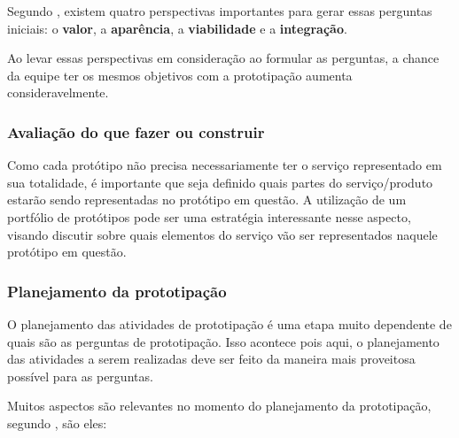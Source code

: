 Segundo \cite{Stickdorn2019}, existem quatro perspectivas importantes para gerar essas perguntas iniciais: o \textbf{valor}, a \textbf{aparência}, a \textbf{viabilidade} e a \textbf{integração}. 

Ao levar essas perspectivas em consideração ao formular as perguntas, a chance da equipe ter os mesmos objetivos com a prototipação aumenta consideravelmente.

\subsubsection{Avaliação do que fazer ou construir}

Como cada protótipo não precisa necessariamente ter o serviço representado em sua totalidade, é importante que seja definido quais partes do serviço/produto estarão sendo representadas no protótipo em questão. A utilização de um portfólio de protótipos pode ser uma estratégia interessante nesse aspecto, visando discutir sobre quais elementos do serviço vão ser representados naquele protótipo em questão.

\subsubsection{Planejamento da prototipação}

O planejamento das atividades de prototipação é uma etapa muito dependente de quais são as perguntas de prototipação. Isso acontece pois aqui, o planejamento das atividades a serem realizadas deve ser feito da maneira mais proveitosa possível para as perguntas.

Muitos aspectos são relevantes no momento do planejamento da prototipação, segundo \cite{Stickdorn2019}, são eles:

